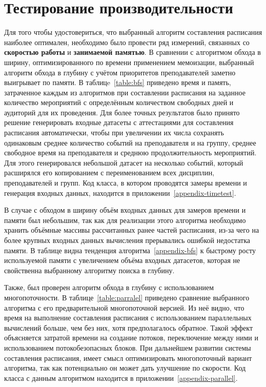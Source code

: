 \section{Тестирование производительности} \label{ch4:sec3}
Для того чтобы удостовериться, что выбранный алгоритм составления расписания наиболее оптимален, необходимо было провести ряд измерений, связанных со \textbf{скоростью работы} и \textbf{занимаемой памятью}. В сравнении с алгоритмом обхода в ширину, оптимизированного по времени применением мемоизации, выбранный алгоритм обхода в глубину с учётом приоритетов преподавателей заметно выигрывает по памяти. В таблицe~\ref{table:bfs} приведено время и память, затраченное каждым из алгоритмов при составлении расписания на заданное количество мероприятий с определённым количеством свободных дней и аудиторий для их проведения. Для более точных результатов было принято решение генерировать входные датасеты с аттестациями для составления расписания автоматически, чтобы при увеличении их числа сохранять одинаковым среднее количество событий на преподавателя и на группу, среднее свободное время на преподавателя и среднюю продолжительность мероприятий. Для этого генерировался небольшой датасет на несколько событий, который расширялся его копированием с переименованием всех дисциплин, преподавателей и групп. Код класса, в котором проводятся замеры времени и генерация входных данных, находится в приложении~\ref{appendix-timetest}.

В случае с обходом в ширину объём входных данных для замеров времени и памяти был небольшим, так как для реализации этого алгоритма необходимо хранить объёмные массивы рассчитанных ранее частей расписания, из-за чего на более крупных входных данных вычисления прерывались ошибкой недостатка памяти. В таблице видна тенденция алгоритма~\ref{appendix-bfs} к быстрому росту используемой памяти с увеличением объёма входных датасетов, которая не свойственна выбранному алгоритму поиска в глубину.

Также, был проверен алгоритм обхода в глубину с использованием многопоточности. В таблице~\ref{table:parralel} приведено сравнение выбранного алгоритма с его предварительной многопоточной версией. Из неё видно, что время на выполнение составления расписания с использованием параллельных вычислений больше, чем без них, хотя предполагалось обратное. Такой эффект объясняется затратой времени на создание потоков, переключение между ними и использованием потокобезопасных блоков. При дальнейшем развитии системы составления расписания, имеет смысл оптимизировать многопоточный вариант алгоритма, так как потенциально он может дать улучшение по скорости. Код класса с данным алгоритмом находится в приложении~\ref{appendix-parallel}.

